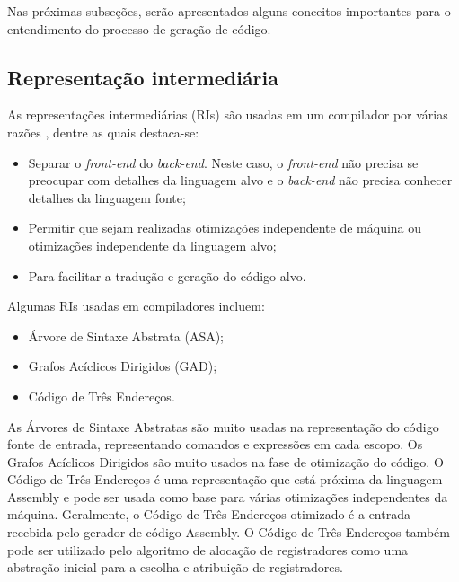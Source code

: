\documentclass[
	12pt,				%
	openright,			%
	oneside,			%
	a4paper,			%
	main=brazil,
	english,			%
	]{ufsj-abntex2}
\begin{document}
Nas próximas subseções, serão apresentados alguns conceitos importantes para o entendimento do processo de geração de código. 

\subsection{Representação intermediária}

As representações intermediárias (RIs) são usadas em um compilador por várias razões \cite{dragonBook}, dentre as quais destaca-se: 
\begin{itemize}
    \item Separar o \textit{front-end} do \textit{back-end}. Neste caso, o \textit{front-end} não precisa se preocupar com detalhes da linguagem alvo e o \textit{back-end} não precisa conhecer detalhes da linguagem fonte;
    \item Permitir que sejam realizadas otimizações independente de máquina ou otimizações independente da linguagem alvo; 
    \item Para facilitar a tradução e geração do código alvo.    
\end{itemize}

Algumas RIs usadas em compiladores incluem:  
\begin{itemize}
    \item Árvore de Sintaxe Abstrata (ASA); 
    \item Grafos Acíclicos Dirigidos (GAD); 
    \item Código de Três Endereços. 
\end{itemize}

As Árvores de Sintaxe Abstratas são muito usadas na representação do código fonte de entrada, representando comandos e expressões em cada escopo. Os Grafos Acíclicos Dirigidos são muito usados na fase de otimização do código. O Código de Três Endereços é uma representação que está próxima da linguagem Assembly e pode ser usada como base para várias otimizações independentes da máquina. Geralmente, o Código de Três Endereços otimizado é a entrada recebida pelo gerador de código Assembly. O Código de Três Endereços também pode ser utilizado pelo algoritmo de alocação de registradores como uma abstração inicial para a escolha e atribuição de registradores.    

\end{document}

